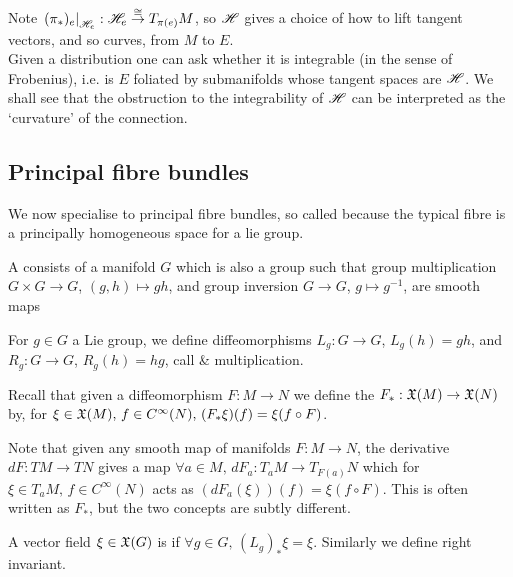\documentclass{article}
\begin{document}
Note $\left. (\pi_\ast)_e \right\rvert_{\mathscr{H}_e} : \mathscr{H}_e \overset{\cong}{\to} T_{\pi(e)}M$, so $\mathscr{H}$ gives a choice of how to lift tangent vectors, and so curves, from $M$ to $E$. \\
Given a distribution one can ask whether it is integrable (in the sense of Frobenius), i.e. is $E$ foliated by submanifolds whose tangent spaces are $\mathscr{H}$. We shall see that the obstruction to the integrability of $\mathscr{H}$ can be interpreted as the `curvature' of the connection. 
\subsection{Principal fibre bundles}
We now specialise to principal fibre bundles, so called because the typical fibre is a principally homogeneous space for a lie group. 

\begin{definition}
	A  consists of a manifold $G$ which is also a group such that group multiplication $G \times G \to G$, $(g,h)\mapsto gh$, and group inversion $G \to G$, $g \mapsto g^{-1}$, are smooth maps
\end{definition}

For $g \in G$ a Lie group, we define diffeomorphisms $L_g : G \to G$, $L_g(h) = gh$, and $R_g : G \to G$, $R_g(h) = hg$, call  \&  multiplication. 

\begin{definition}
	Recall that given a diffeomorphism $F:M \to N$ we define the  $F_\ast : \mathfrak{X}(M) \to \mathfrak{X}(N)$ by, for $\xi \in \mathfrak{X}(M), \, f \in C^\infty(N), \, (F_\ast \xi)(f) = \xi(f \circ F)$.
\end{definition}

\begin{remark}
	Note that given any smooth map of manifolds $F:M \to N$, the derivative $dF:TM \to TN$ gives a map $\forall a \in M, \, dF_a : T_a M \to T_{F(a)}N$ which for $\xi \in T_a M, \, f \in C^\infty(N)$ acts as $(dF_a(\xi))(f) = \xi(f \circ F)$. This is often written as $F_\ast$, but the two concepts are subtly different.
\end{remark}

\begin{definition}
	A vector field $\xi\in \mathfrak{X}(G)$ is  if $\forall g \in G, \, (L_g)_\ast \xi = \xi$. Similarly we define right invariant.
\end{definition}
\end{document}
